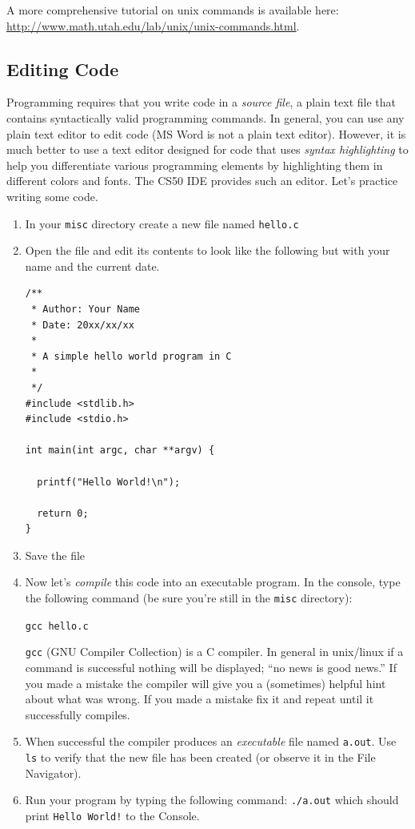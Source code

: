 \documentclass[12pt]{scrartcl}
\begin{document}
A more comprehensive tutorial on unix commands is available here: 
\url{http://www.math.utah.edu/lab/unix/unix-commands.html}.

\subsection{Editing Code}

Programming requires that you write code in a \emph{source file}, 
a plain text file that contains syntactically valid programming 
commands.  In general, you can use any plain text editor to edit
code (MS Word is not a plain text editor).  However, it is much
better to use a text editor designed for code that uses 
\emph{syntax highlighting} to help you differentiate various programming elements
by highlighting them in different colors and fonts.  The CS50 IDE
provides such an editor.  Let's practice writing some code.

\begin{enumerate}
  \item In your \texttt{misc} directory create a new file
  named \texttt{hello.c}
  \item Open the file and edit its contents to look like the 
  following but with your name and the current date.
  
\begin{verbatim}
/**
 * Author: Your Name
 * Date: 20xx/xx/xx
 *
 * A simple hello world program in C
 *
 */
#include <stdlib.h>
#include <stdio.h>

int main(int argc, char **argv) {

  printf("Hello World!\n");

  return 0;
}
\end{verbatim}

  \item Save the file
  \item Now let's \emph{compile} this code into an executable program.
  In the console, type the following command (be sure you're still in the 
  \texttt{misc} directory): %

  \texttt{gcc hello.c}
  
  \texttt{gcc} (GNU Compiler Collection) is a C compiler.  
  In general in unix/linux if a command is successful nothing will 
  be displayed; ``no news is good news.''  If you made a mistake the
  compiler will give you a (sometimes) helpful hint about what was wrong.
  If you made a mistake fix it and repeat until it successfully compiles.
  \item When successful the compiler produces an \emph{executable} file 
  named \texttt{a.out}.  Use \texttt{ls} to verify 
  that the new file has been created (or observe it in the File Navigator).  
  \item Run your program by typing the following command: 
  \texttt{./a.out} which should print \texttt{Hello World!}
  to the Console.  
\end{enumerate}
\end{document}
